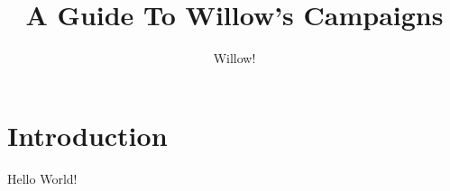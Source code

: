 \documentclass[letterpaper,twocolumn,openany]{dndarticle}
\title{A Guide To Willow's Campaigns}
\author{Willow!}
\begin{document}
\section{Introduction}
Hello World!
\end{document}
